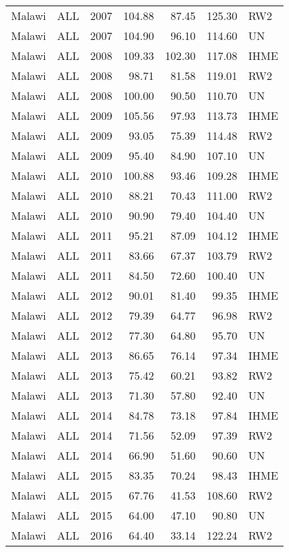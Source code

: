 \begin{longtable}{lllrrrl}
  Malawi & ALL & 2007 & 104.88 & 87.45 & 125.30 & RW2 \\ 
  Malawi & ALL & 2007 & 104.90 & 96.10 & 114.60 & UN \\ 
  Malawi & ALL & 2008 & 109.33 & 102.30 & 117.08 & IHME \\ 
  Malawi & ALL & 2008 & 98.71 & 81.58 & 119.01 & RW2 \\ 
  Malawi & ALL & 2008 & 100.00 & 90.50 & 110.70 & UN \\ 
  Malawi & ALL & 2009 & 105.56 & 97.93 & 113.73 & IHME \\ 
  Malawi & ALL & 2009 & 93.05 & 75.39 & 114.48 & RW2 \\ 
  Malawi & ALL & 2009 & 95.40 & 84.90 & 107.10 & UN \\ 
  Malawi & ALL & 2010 & 100.88 & 93.46 & 109.28 & IHME \\ 
  Malawi & ALL & 2010 & 88.21 & 70.43 & 111.00 & RW2 \\ 
  Malawi & ALL & 2010 & 90.90 & 79.40 & 104.40 & UN \\ 
  Malawi & ALL & 2011 & 95.21 & 87.09 & 104.12 & IHME \\ 
  Malawi & ALL & 2011 & 83.66 & 67.37 & 103.79 & RW2 \\ 
  Malawi & ALL & 2011 & 84.50 & 72.60 & 100.40 & UN \\ 
  Malawi & ALL & 2012 & 90.01 & 81.40 & 99.35 & IHME \\ 
  Malawi & ALL & 2012 & 79.39 & 64.77 & 96.98 & RW2 \\ 
  Malawi & ALL & 2012 & 77.30 & 64.80 & 95.70 & UN \\ 
  Malawi & ALL & 2013 & 86.65 & 76.14 & 97.34 & IHME \\ 
  Malawi & ALL & 2013 & 75.42 & 60.21 & 93.82 & RW2 \\ 
  Malawi & ALL & 2013 & 71.30 & 57.80 & 92.40 & UN \\ 
  Malawi & ALL & 2014 & 84.78 & 73.18 & 97.84 & IHME \\ 
  Malawi & ALL & 2014 & 71.56 & 52.09 & 97.39 & RW2 \\ 
  Malawi & ALL & 2014 & 66.90 & 51.60 & 90.60 & UN \\ 
  Malawi & ALL & 2015 & 83.35 & 70.24 & 98.43 & IHME \\ 
  Malawi & ALL & 2015 & 67.76 & 41.53 & 108.60 & RW2 \\ 
  Malawi & ALL & 2015 & 64.00 & 47.10 & 90.80 & UN \\ 
  Malawi & ALL & 2016 & 64.40 & 33.14 & 122.24 & RW2 \\ 

\end{longtable}
